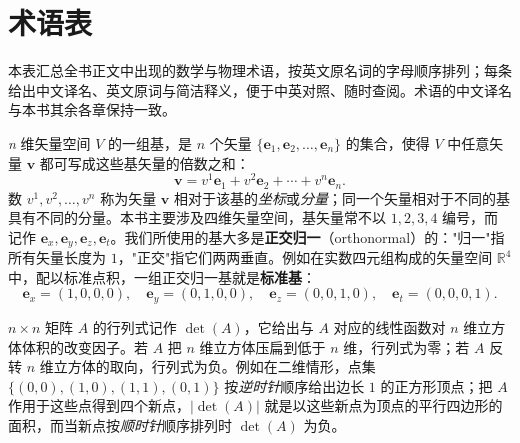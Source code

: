 \chapter{术语表}

本表汇总全书正文中出现的数学与物理术语，按英文原名词的字母顺序排列；每条给出中文译名、英文原词与简洁释义，便于中英对照、随时查阅。术语的中文译名与本书其余各章保持一致。

\begin{description}[style=nextline, leftmargin=0em, itemsep=0.8ex]

\item[基（Basis）]
\emph{n} 维矢量空间 $V$ 的一组基，是 $n$ 个矢量 $\{\mathbf{e}_1,\mathbf{e}_2,\dots,\mathbf{e}_n\}$ 的集合，使得 $V$ 中任意矢量 $\mathbf{v}$ 都可写成这些基矢量的倍数之和：
\[
\mathbf{v} = v^{1}\mathbf{e}_{1} + v^{2}\mathbf{e}_{2} + \cdots + v^{n}\mathbf{e}_{n} .
\]
数 $v^{1},v^{2},\dots,v^{n}$ 称为矢量 $\mathbf{v}$ 相对于该基的\emph{坐标}或\emph{分量}；同一个矢量相对于不同的基具有不同的分量。本书主要涉及四维矢量空间，基矢量常不以 $1,2,3,4$ 编号，而记作 $\mathbf{e}_x,\mathbf{e}_y,\mathbf{e}_z,\mathbf{e}_t$。我们所使用的基大多是\textbf{正交归一}（orthonormal）的："归一"指所有矢量长度为 $1$，"正交"指它们两两垂直。例如在实数四元组构成的矢量空间 $\mathbb{R}^4$ 中，配以标准点积，一组正交归一基就是\textbf{标准基}：
\[
\mathbf{e}_x=(1,0,0,0),\quad \mathbf{e}_y=(0,1,0,0),\quad \mathbf{e}_z=(0,0,1,0),\quad \mathbf{e}_t=(0,0,0,1).
\]


\item[行列式（Determinant）]
$n\times n$ 矩阵 $A$ 的行列式记作 $\det(A)$，它给出与 $A$ 对应的线性函数对 $n$ 维立方体体积的改变因子。若 $A$ 把 $n$ 维立方体压扁到低于 $n$ 维，行列式为零；若 $A$ 反转 $n$ 维立方体的取向，行列式为负。例如在二维情形，点集 $\{(0,0),(1,0),(1,1),(0,1)\}$ 按\emph{逆时针}顺序给出边长 $1$ 的正方形顶点；把 $A$ 作用于这些点得到四个新点，$|\det(A)|$ 就是以这些新点为顶点的平行四边形的面积，而当新点按\emph{顺时针}顺序排列时 $\det(A)$ 为负。



\end{description}
